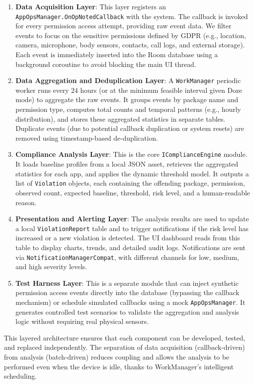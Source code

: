 \begin{enumerate}
\item \textbf{Data Acquisition Layer}: This layer registers an \texttt{AppOpsManager.OnOpNotedCallback} with the system. The callback is invoked for every permission access attempt, providing raw event data. We filter events to focus on the sensitive permissions defined by GDPR (e.g., location, camera, microphone, body sensors, contacts, call logs, and external storage). Each event is immediately inserted into the Room database using a background coroutine to avoid blocking the main UI thread.
\item \textbf{Data Aggregation and Deduplication Layer}: A \texttt{WorkManager} periodic worker runs every 24 hours (or at the minimum feasible interval given Doze mode) to aggregate the raw events. It groups events by package name and permission type, computes total counts and temporal patterns (e.g., hourly distribution), and stores these aggregated statistics in separate tables. Duplicate events (due to potential callback duplication or system resets) are removed using timestamp-based de-duplication.
\item \textbf{Compliance Analysis Layer}: This is the core \texttt{IComplianceEngine} module. It loads baseline profiles from a local JSON asset, retrieves the aggregated statistics for each app, and applies the dynamic threshold model. It outputs a list of \texttt{Violation} objects, each containing the offending package, permission, observed count, expected baseline, threshold, risk level, and a human-readable reason.
\item \textbf{Presentation and Alerting Layer}: The analysis results are used to update a local \texttt{ViolationReport} table and to trigger notifications if the risk level has increased or a new violation is detected. The UI dashboard reads from this table to display charts, trends, and detailed audit logs. Notifications are sent via \texttt{NotificationManagerCompat}, with different channels for low, medium, and high severity levels.
\item \textbf{Test Harness Layer}: This is a separate module that can inject synthetic permission access events directly into the database (bypassing the callback mechanism) or schedule simulated callbacks using a mock \texttt{AppOpsManager}. It generates controlled test scenarios to validate the aggregation and analysis logic without requiring real physical sensors.
\end{enumerate}

This layered architecture ensures that each component can be developed, tested, and replaced independently. The separation of data acquisition (callback-driven) from analysis (batch-driven) reduces coupling and allows the analysis to be performed even when the device is idle, thanks to WorkManager's intelligent scheduling.

